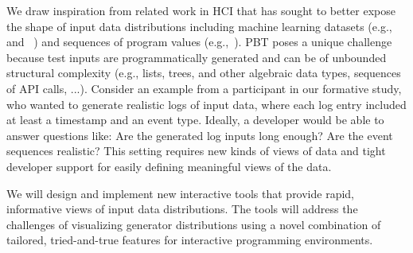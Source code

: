 We draw inspiration from related work in HCI that has sought to better expose
the shape of input data distributions including
machine learning datasets
(e.g.,~\cite{ref:hohman2019gamut} and
~\cite{ref:hohman2020understanding}) and sequences of program values
(e.g.,~\cite{ref:kang2017omnicode}).
PBT poses a unique challenge because test inputs are
programmatically generated and
can be of unbounded structural
complexity (e.g., lists, trees, and other algebraic data types,
sequences of API calls, ...).
Consider an
example from a participant in our formative study, who wanted to generate
realistic logs of input data, where each log entry included at least a timestamp
and an event type.
Ideally, a developer would be able to answer
questions like: Are the generated log inputs long enough? Are the
event sequences
realistic? This setting requires new kinds of views of data and tight
developer support for easily defining meaningful views of the data.

We will design and implement new interactive tools that provide rapid,
informative views of input data distributions. The tools will address the
challenges of visualizing generator distributions using a novel combination of
tailored, tried-and-true features for interactive programming environments.

